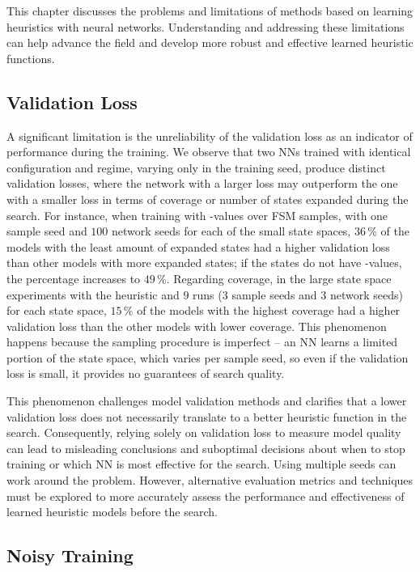 This chapter discusses the problems and limitations of methods based on learning heuristics with neural networks. Understanding and addressing these limitations can help advance the field and develop more robust and effective learned heuristic functions.

\subsection{Validation Loss}
\label{sec:validation-loss}

A significant limitation is the unreliability of the validation loss as an indicator of performance during the training. We observe that two NNs trained with identical configuration and regime, varying only in the training seed, produce distinct validation losses, where the network with a larger loss may outperform the one with a smaller loss in terms of coverage or number of states expanded during the search. For instance, when training with \hstar-values over FSM samples, with one sample seed and $100$ network seeds for each of the small state spaces, $36\,\%$ of the models with the least amount of expanded states had a higher validation loss than other models with more expanded states; if the states do not have \hstar-values, the percentage increases to $49\,\%$. Regarding coverage, in the large state space experiments with the heuristic \hnnrs and $9$ runs ($3$ sample seeds and $3$ network seeds) for each state space, $15\,\%$ of the models with the highest coverage had a higher validation loss than the other models with lower coverage. This phenomenon happens because the sampling procedure is imperfect -- an NN learns a limited portion of the state space, which varies per sample seed, so even if the validation loss is small, it provides no guarantees of search quality.

This phenomenon challenges model validation methods and clarifies that a lower validation loss does not necessarily translate to a better heuristic function in the search. Consequently, relying solely on validation loss to measure model quality can lead to misleading conclusions and suboptimal decisions about when to stop training or which NN is most effective for the search. Using multiple seeds can work around the problem. However, alternative evaluation metrics and techniques must be explored to more accurately assess the performance and effectiveness of learned heuristic models before the search.

\subsection{Noisy Training}
\label{sec:noisy-training}

